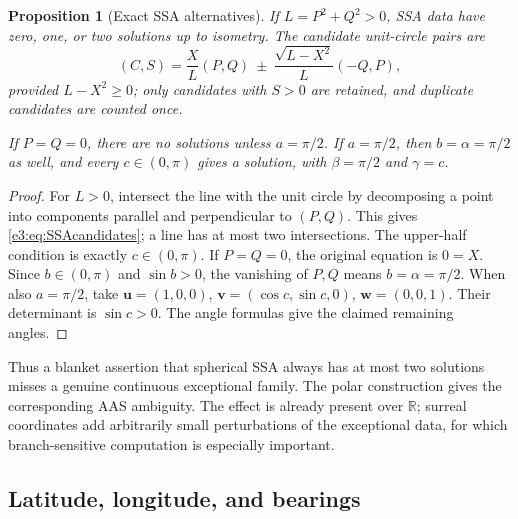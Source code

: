 \documentclass[11pt,letterpaper]{article}
\numberwithin{equation}{section}
\newtheorem{proposition}[proposition]{Proposition}
\theoremstyle{definition}
\theoremstyle{remark}
\newcommand{\R}{\mathbb R}
\newcommand{\vv}[1]{\bm{#1}}
\begin{document}
\begin{proposition}[Exact SSA alternatives]\label{e3:prop:SSA}
If $L=P^2+Q^2>0$, SSA data have zero, one, or two solutions up to isometry.
The candidate unit-circle pairs are
\begin{equation}\label{e3:eq:SSAcandidates}
 (C,S)=\frac{X}{L}(P,Q)
 \ \pm\ \frac{\sqrt{L-X^2}}{L}(-Q,P),
\end{equation}
provided $L-X^2\ge0$; only candidates with $S>0$ are retained, and duplicate
candidates are counted once.

If $P=Q=0$, there are no solutions unless $a=\pi/2$. If $a=\pi/2$,
then $b=\alpha=\pi/2$ as well, and \emph{every} $c\in(0,\pi)$ gives a
solution, with $\beta=\pi/2$ and $\gamma=c$.
\end{proposition}
\begin{proof}
For $L>0$, intersect the line with the unit circle by decomposing a point into
components parallel and perpendicular to $(P,Q)$. This gives
\cref{e3:eq:SSAcandidates}; a line has at most two intersections. The upper-half
condition is exactly $c\in(0,\pi)$.
If $P=Q=0$, the original equation is $0=X$. Since $b\in(0,\pi)$ and
$\sin b>0$, the vanishing of $P,Q$ means $b=\alpha=\pi/2$.
When also $a=\pi/2$, take
$\vv u=(1,0,0)$, $\vv v=(\cos c,\sin c,0)$, $\vv w=(0,0,1)$.
Their determinant is $\sin c>0$. The angle formulas give the claimed
remaining angles.
\end{proof}

Thus a blanket assertion that spherical SSA always has at most two solutions
misses a genuine continuous exceptional family. The polar construction gives
the corresponding AAS ambiguity. The effect is already present over $\R$;
surreal coordinates add arbitrarily small perturbations of the exceptional
data, for which branch-sensitive computation is especially important.

\subsection{Latitude, longitude, and bearings}
\end{document}
